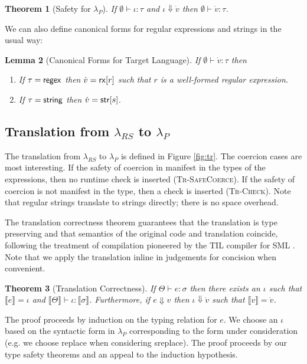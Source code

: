 \documentclass[10pt]{sigplanconf}
\newtheorem{thm}{Theorem}
\newtheorem{lem}[thm]{Lemma}
\theoremstyle{definition}
\newcommand{\lambdas}{\lambda_{RS}}
\newcommand{\lambdap}{\lambda_P}
\renewcommand{\tstr}[1]{{{\sf str}[#1]}}
\newcommand{\rx}[1]{ {\sf rx}[#1] }
\newcommand{\str}{{\sf string}}
\newcommand{\regex}{{\sf regex}}
\newcommand{\tctx}{\Theta} %
\newcommand{\trden}[1]{\llbracket #1 \rrbracket} %
\newcommand{\treduces}{ \Downarrow }
\newcommand{\sreduces}{ \Downarrow }
\begin{document}
\begin{thm}[Safety for $\lambdap$] If $\emptyset \vdash \iota : \tau$ 
  and $\iota \sreduces \dot v$ then $\emptyset \vdash \dot v : \tau$.
\end{thm}

We can also define canonical forms for regular expressions and strings in the usual way:


\begin{lem}[Canonical Forms for Target Language]
If $\emptyset \vdash \dot{v} : \tau$ then 
\begin{enumerate}
\item 
If $\tau=\regex$ then $\dot{v}= \rx{r}$ such that $r$ is a well-formed regular expression. 
\item 
If $\tau=\str$ then $\dot{v} = \tstr{s}$.
\end{enumerate}
\end{lem}

\subsection{Translation from $\lambdas$ to $\lambdap$}\label{sec:tr}


The translation from $\lambdas$ to $\lambdap$ is defined in Figure \ref{fig:tr}.
The coercion cases are most interesting. If the safety of coercion in manifest in the
types of the expressions, then no runtime check is inserted (\textsc{Tr-SafeCoerce}).
If the safety of coercion is not manifest in the type, then a check is inserted (\textsc{Tr-Check}). Note that regular strings translate to strings directly; there is no space overhead.

The translation correctness theorem guarantees that the translation is type preserving and that semantics of the original code and translation coincide, following the treatment of compilation pioneered by the TIL compiler for SML \cite{tarditi+:til-OLD}. Note that we apply the translation inline in judgements for concision when convenient. 

\begin{thm}[Translation Correctness]\label{thm:trcorrect}
  If $\tctx \vdash e : \sigma$ then 
  there exists an $\iota$ such that $\trden{e} = \iota$
  and $\trden{\tctx} \vdash \iota : \trden{\sigma}$.
  Furthermore, if $e \sreduces v$ then
  $\iota \treduces \dot{v}$ such that
  $\trden{v} = \dot{v}$.
\end{thm}
\begin{prf}
The proof proceeds by induction on the typing relation for $e$. We choose an $\iota$ based on the syntactic form in $\lambdap$ corresponding to the form under consideration (e.g. we  choose {\sf replace} when considering {\sf sreplace}).
The proof proceeds by our type safety theorems and an appeal to the induction hypothesis.
\end{prf}
\end{document}
